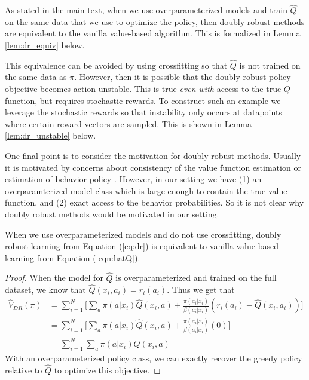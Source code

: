 \begin{subappendices}
As stated in the main text, when we use overparameterized models and train $ \hat Q$ on the same data that we use to optimize the policy, then doubly robust methods are equivalent to the vanilla value-based algorithm. This is formalized in Lemma \ref{lem:dr_equiv} below.

This equivalence can be avoided by using crossfitting so that $ \hat Q$ is not trained on the same data as $ \pi$. However, then it is possible that the doubly robust policy objective becomes action-unstable. This is true \emph{even with} access to the true $Q$ function, but requires stochastic rewards. To construct such an example we leverage the stochastic rewards so that instability only occurs at datapoints where certain reward vectors are sampled. This is shown in Lemma \ref{lem:dr_unstable} below.

One final point is to consider the motivation for doubly robust methods. Usually it is motivated by concerns about consistency of the value function estimation or estimation of behavior policy \cite{dudik2011doubly}. However, in our setting we have (1) an overparamterized model class which is large enough to contain the true value function, and (2) exact access to the behavior probabilities. So it is not clear why doubly robust methods would be motivated in our setting.

\begin{lemma}\label{lem:dr_equiv}
When we use overparameterized models and do not use crossfitting, doubly robust learning from Equation (\ref{eq:dr}) is equivalent to vanilla value-based learning from Equation (\ref{eqn:hatQ}).
\end{lemma}

\begin{proof}
When the model for $ \hat Q$ is overparameterized and trained on the full dataset, we know that $ \hat Q(x_i, a_i) = r_i(a_i)$. Thus we get that
\begin{align}
    \widehat V_{DR} (\pi) &= \sum_{i=1}^N \bigg[ \sum_a \pi(a|x_i) \hat Q(x_i, a) + \frac{\pi(a_i|x_i)}{\beta(a_i|x_i)} (r_i(a_i) - \hat Q(x_i, a_i)) \bigg]\\
    &= \sum_{i=1}^N \bigg[ \sum_a \pi(a|x_i) \hat Q(x_i, a) + \frac{\pi(a_i|x_i)}{\beta(a_i|x_i)} (0) \bigg]\\
    &= \sum_{i=1}^N \sum_a \pi(a|x_i) \hat Q(x_i, a)
\end{align}
With an overparameterized policy class, we can exactly recover the greedy policy relative to $ \hat Q$ to optimize this objective.
\end{proof}



\end{subappendices}
